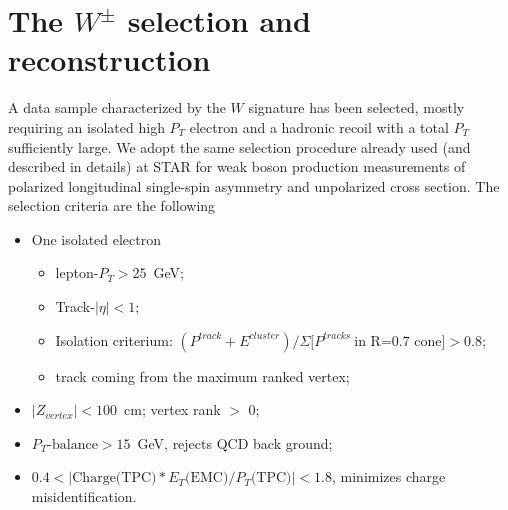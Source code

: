 \documentclass[12pt]{article}
\begin{document}




\section{The $W^{\pm}$ selection and reconstruction}
\label{Wselection}
A data sample characterized by the $W$ signature has been selected, mostly requiring an isolated high $P_{T}$ electron and a hadronic recoil with a total $P_{T}$ sufficiently large. We adopt the same selection procedure already used (and described in details) at STAR for weak boson production measurements of polarized longitudinal single-spin asymmetry\cite{STAR_W_AL_2009-paper, STAR_W_AL_2009-note, STAR_W_AL_2012-paper, STAR_W_AL_2012-note} and unpolarized cross section\cite{STAR_W_xSec_2009-paper,STAR_W_xSec_2009-note}. The selection criteria are the following

\begin{itemize}
\item One isolated electron
    \begin{itemize}
    \item lepton-$P_{T}>25$~GeV;
    \item Track-$|\eta|<1$;
    \item Isolation criterium: $(P^{track}+E^{cluster})/\Sigma[P^{tracks}~\text{in R=0.7 cone]} > 0.8$;
    \item track coming from the maximum ranked vertex;
    \end{itemize}
\item $|Z_{vertex}| < 100$~cm; vertex rank $>$ 0;    
\item $P_{T}\text{-balance} > 15$~GeV, rejects QCD back ground;
\item $0.4 < |\text{Charge(TPC)}*E_{T}\text{(EMC)}/P_{T}\text{(TPC)}| < 1.8$, minimizes charge misidentification.
\end{itemize}
\end{document}

